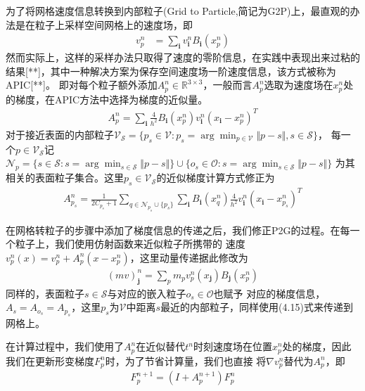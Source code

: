 为了将网格速度信息转换到内部粒子(Grid to Particle,简记为G2P)上，最直观的办法是在粒子上采样空间网格上的速度场，即
\begin{align}
    v_p^n &= \sum_{\mathbf{i}} v_{\mathbf{i}}^n B_{\mathbf{i}}(x_p^n)
\end{align}
然而实际上，这样的采样办法只取得了速度的零阶信息，在实践中表现出来过粘的结果[**]，其中一种解决方案为保存空间速度场一阶速度信息，该方式被称为APIC[**]。
即对每个粒子额外添加$A_p^n \in \mathbb{R}^{3\times 3}$，一般而言$A_p^n$选取为速度场在$x_p^n$处的梯度，在APIC方法中选择为梯度的近似量。
\begin{align}
    A_p^n = \sum_{\mathbf{i}} \frac{4}{h^2}B_{\mathbf{i}}(x_p^n)v_{\mathbf{i}}^n(x_\mathbf{i} - x_p^n)^T
\end{align}
对于接近表面的内部粒子$\mathcal{V}_{\mathcal{S}} = \{p_s \in \mathcal{V}:p_s = \arg\min_{p \in \mathcal{V}} \Vert p - s\Vert, s\in \mathcal{S}\}$，
每一个$p\in \mathcal{V}_{\mathcal{S}}$记$\mathcal{N}_{p} = \{s\in \mathcal{S}:s = \arg\min_{s\in \mathcal{S}}\Vert p - s\Vert\}\cup \{o_s \in \mathcal{O}:s = \arg\min_{s\in \mathcal{S}}\Vert p - s\Vert\}$
为其相关的表面粒子集合。这里$p_s \in \mathcal{V}_\mathcal{S}$的近似梯度计算方式修正为
\begin{align}
    A_{p_s}^n = \frac{1}{2C_{p_s} + 1}\sum_{q \in \mathcal{N}_{p_s}\cup \{p_s\}}\sum_{\mathbf{i}} B_{\mathbf{i}}(x_q^n)\frac{4}{h^2}v_{\mathbf{i}}^n(x_\mathbf{i} - x_{p_s}^n)^T
\end{align}

在网格转粒子的步骤中添加了梯度信息的传递之后，我们修正P2G的过程。在每一个粒子上，我们使用仿射函数来近似粒子所携带的
速度$v_p^n(x) = v_p^n + A_p^n(x - x_p^n)$，这里动量传递据此修改为
\begin{align}
    (mv)_{\mathbf{j}}^n = \sum_{p}m_pv_p^n(x_\mathbf{j})B_{\mathbf{j}}(x_p^n)
\end{align}
同样的，表面粒子$s\in \mathcal{S}$与对应的嵌入粒子$o_s \in \mathcal{O}$也赋予
对应的梯度信息，$A_s = A_{o_s} = A_{p_s}$，这里$p_s$为$\mathcal{V}$中距离$s$最近的内部粒子，同样使用(4.15)式来传递到网格上。

在计算过程中，我们使用了$A_p^n$在近似替代$t^n$时刻速度场在位置$x_p^n$处的梯度，因此我们在更新形变梯度$F^n_p$时，为了节省计算量，我们也直接
将$\nabla v^n_p$替代为$A_p^n$，即
\begin{align}
    F_p^{n+1} = (I + A_p^{n+1})F_p^n
\end{align}
